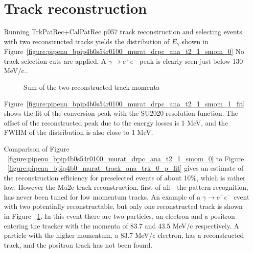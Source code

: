 %
\section{Track reconstruction}

Running TrkPatRec+CalPatRec p057 track reconstruction and selecting events
with two reconstructed tracks yields the distribution of $E_\gamma$
shown in Figure~\ref{figure:pipenu_bpip4b0s54r0100_murat_drpc_ana_t2_1_smom_0}
No track selection cuts are applied. A $\gamma \to e^+e^-$ peak  is clearly seen just below
130 MeV/c..

\begin{figure}[H]
  \caption{
    \label{figure:pipenu_bpip4b0s54r0100_murat_drpc_ana_t2_1_smom_0}
    Sum of the two reconstructed track momenta
  }
  \label{figure:event_display}
\end{figure}

Figure~\ref{figure:pipenu_bpip4b0s54r0100_murat_drpc_ana_t2_1_smom_1_fit} shows the fit
of the conversion peak with the SU2020 resolution function.
The offset of the reconstructed peak due to the energy losses is 1 MeV, and the FWHM
of the distribution is also close to 1 MeV.

Comparison of Figure ~\ref{figure:pipenu_bpip4b0s54r0100_murat_drpc_ana_t2_1_smom_0} 
to Figure ~\ref{figure:pipenu_bpip4b0_murat_track_ana_trk_0_p_fit}
gives an estimate of the reconstruction efficiency for preselected events of about 10\%,
which is rather low.
%
However the Mu2e track reconstruction, first of all - the pattern recognition,
has never been tuned for low momentum tracks. An example of a $\gamma \to e^+e^-$
event with two potentially reconstructable, but only one reconstructed track
is shown in Figure ~\ref{figure:event_display}. In this event there are two particles,
an electron and a positron entering the tracker with the momenta of 83.7 and 43.5 MeV/c
respectively. A particle with the higher momentum, a 83.7 MeV/c electron, has a reconstructed track,
and  the positron track has not been found.  

